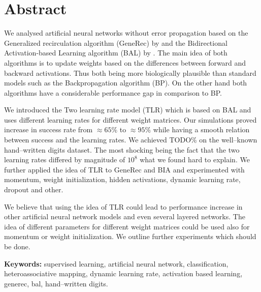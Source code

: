 
\section*{Abstract}

We analysed artificial neural networks without error propagation based on the Generalized recirculation algorithm (GeneRec) by \citet{o1996bio} and the Bidirectional Activation-based Learning algorithm (BAL) by \citet{farkas2013bal}. The main idea of both algorithms is to update weights based on the differences between forward and backward activations. Thus both being more biologically plausible than standard models such as the Backpropagation algorithm (BP). On the other hand both algorithms have a considerable performance gap in comparison to BP.

We introduced the Two learning rate model (TLR) which is based on BAL and uses different learning rates for different weight matrices. Our simulations proved increase in success rate from $\approx 65\%$ to $\approx 95\%$ while having a smooth relation between success and the learning rates. We achieved TODO\% on the well--known hand--written digits dataset. The most shocking being the fact that the two learning rates differed by magnitude of $10^8$ what we found hard to explain. We further applied the idea of TLR to GeneRec and BIA and experimented with momentum, weight initialization, hidden activations, dynamic learning rate, dropout and other. 

We believe that using the idea of TLR could lead to performance increase in other artificial neural network models and even several layered networks. The idea of different parameters for different weight matrices could be used also for momentum or weight initialization. We outline further experiments which should be done. 

\begin{flushleft}
  \textbf{Keywords:} supervised learning, artificial neural network, classification, heteroassociative mapping, dynamic learning rate, activation based learning, generec, bal, hand--written digits. 
\end{flushleft}


